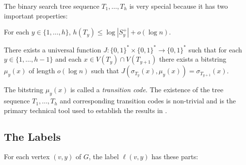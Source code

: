\documentclass{patmorin}
\begin{document}
The binary search tree sequence $T_1,\ldots,T_h$ is very special because it has two important properties:
\begin{compactenum}[(P1)]\setcounter{enumi}{4}
    \item For each $y\in\{1,\ldots,h\}$, $h(T_y)\le \log|S^+_y|+o(\log n)$.
    \item There exists a universal function $J:\{0,1\}^*\times\{0,1\}^*\to\{0,1\}^*$ such that for each $y\in\{1,\ldots,h-1\}$ and each $x\in V(T_y)\cap V(T_{y+1})$ there exists a bitstring $\mu_y(x)$ of length $o(\log n)$ such that $J(\sigma_{T_y}(x),\mu_y(x))=\sigma_{T_{y+1}}(x)$.
\end{compactenum}
The bitstring $\mu_y(x)$ is called a \emph{transition code}.  The existence of the tree sequence $T_1,\ldots,T_h$ and corresponding transition codes is non-trivial and is the primary technical tool used to establish the results in \cite{dujmovic.esperet.ea:adjacency,esperet.joret.ea:sparse}.

\subsection{The Labels}
\label{labels-i}

For each vertex $(v,y)$ of $G$, the label $\ell(v,y)$ has these parts:
\end{document}
